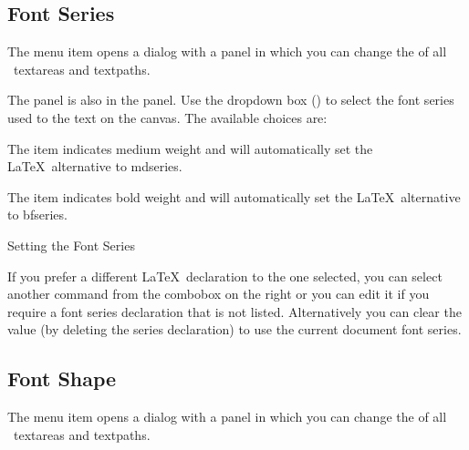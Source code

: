 
\subsection{Font Series}\label{sec:fontseries}


The  menu item opens a dialog with a 
 panel in which you can change the
of all \selected\ \glspl{textarea} and \glspl{textpath}.


The  panel is also in the 
panel. Use the dropdown box () to
select the font series used to  the
text on the \gls{canvas}.
The available choices are:


The  item indicates medium weight and
will automatically set the \LaTeX\ alternative to \gls{mdseries}.


The  item indicates bold weight and
will automatically set the \LaTeX\ alternative to \gls{bfseries}.

{}
{Setting the Font Series}

If you prefer a different \LaTeX\ declaration to the one selected,
you can select another command from the \gls{combobox} on the right
or you can edit it if you require a font series declaration that is
not listed.  Alternatively you can clear the value (by deleting the
series declaration) to use the current document font series.

\subsection{Font Shape}\label{sec:fontshape}


The  menu item opens a dialog with a 
 panel in which you can change the
of all \selected\ \glspl{textarea} and \glspl{textpath}.

